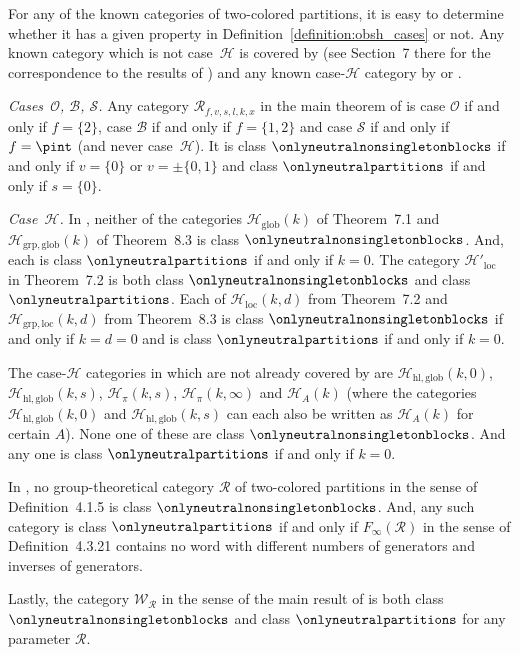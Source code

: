 \documentclass[pdftex]{sigma}
\numberwithin{equation}{section}
\begin{document}
\begin{Remark}
  \label{remark:two-colored-categories}
  \newcommand{\anycat}{\mathcal{R}}
  For any of the known categories of two-colored partitions, it is easy to determine whether it has a given property in Definition~\ref{definition:obsh_cases} or not. Any known category which is not case~$\mathcal{H}$ is covered by \cite{MangWeber2021b} (see Section~7 there for the correspondence to the results of \cite{Gromada2018, MangWeber2020, MangWeber2021a, TarragoWeber2018}) and any known case-$\mathcal{H}$ category by \cite{Gromada2018,Maassen2021,TarragoWeber2018} or \cite[Chapter~1]{Mang2022}.

\emph{Cases~$\mathcal{O}$, $\mathcal{B}$, $\mathcal{S}$.} Any category $\mathcal{R}_{f,v,s,l,k,x}$ in the main theorem of \cite{MangWeber2021b} is case $\mathcal{O}$ if and only if $f=\{2\}$, case $\mathcal{B}$ if and only if $f=\{1,2\}$ and case $\mathcal{S}$ if and only if $f=\pint$ (and never case~$\mathcal{H}$). It is class $\onlyneutralnonsingletonblocks$ if and only if $v=\{0\}$ or $v=\pm\{0,1\}$ and class $\onlyneutralpartitions$ if and only if $s=\{0\}$.

\emph{Case~$\mathcal{H}$.} In \cite{TarragoWeber2018}, neither of the categories $\mathcal{H}_{\mathrm{glob}}(k)$ of Theorem~7.1 and $\mathcal{H}_{\mathrm{grp},\mathrm{glob}}(k)$ of Theorem~8.3 is class $\onlyneutralnonsingletonblocks$. And, each is class $\onlyneutralpartitions$ if and only if $k=0$. The category  $\mathcal{H}'{}_{\mathrm{loc}}$ in  Theorem~7.2 is both class $\onlyneutralnonsingletonblocks$ and class $\onlyneutralpartitions$. Each of $\mathcal{H}_{\mathrm{loc}}(k,d)$ from Theorem~7.2 and $\mathcal{H}_{\mathrm{grp},\mathrm{loc}}(k,d)$ from Theorem~8.3 is class $\onlyneutralnonsingletonblocks$  if and only if $k=d=0$ and is class $\onlyneutralpartitions$ if and only if $k=0$.

The  case-$\mathcal{H}$ categories in \cite[Table~1]{Gromada2018} which are not already covered by  \cite{TarragoWeber2018} are
$\mathcal{H}_{\mathrm{hl},\mathrm{glob}}(k,0)$,  $\mathcal{H}_{\mathrm{hl},\mathrm{glob}}(k,s)$,  $\mathcal{H}_{\pi}(k,s)$,  $\mathcal{H}_{\pi}(k,\infty)$ and $\mathcal{H}_{A}(k)$ (where the categories $\mathcal{H}_{\mathrm{hl},\mathrm{glob}}(k,0)$ and  $\mathcal{H}_{\mathrm{hl},\mathrm{glob}}(k,s)$ can each also be written as $\mathcal{H}_{A}(k)$ for certain $A$). None one of these are class $\onlyneutralnonsingletonblocks$. And any one is class $\onlyneutralpartitions$ if and only if $k= 0$.

In \cite{Maassen2021}, no group-theoretical category $\anycat$ of two-colored partitions in the sense of Definition~4.1.5 is class $\onlyneutralnonsingletonblocks$. And, any such category is class $\onlyneutralpartitions$ if and only if $F_\infty(\anycat)$ in the sense of Definition~4.3.21 contains no word with different numbers of generators and inverses of generators.

Lastly, the category $\mathcal{W}_{\mathcal{R}}$ in the sense of the main result of \cite[Chapter~1]{Mang2022} is both class $\onlyneutralnonsingletonblocks$ and class $\onlyneutralpartitions$ for any parameter $\mathcal{R}$.
\end{Remark}
\end{document}
